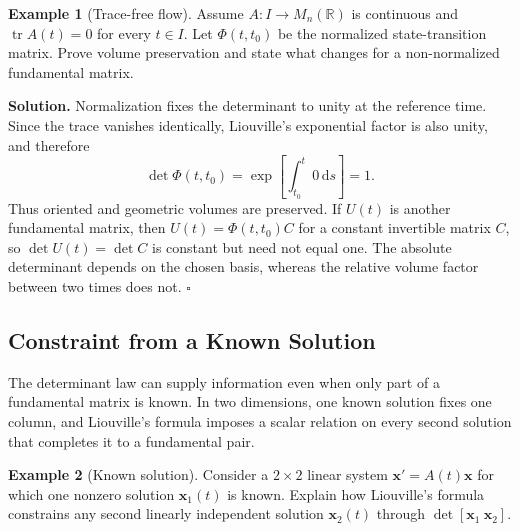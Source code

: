 \documentclass[11pt,a4paper]{article}
\newcommand{\be}{\begin{equation}}
\newcommand{\ee}{\end{equation}}
\newcommand{\lb}[1]{\label{#1}}
\newcommand{\dd}{\mathrm{d}}
\newcommand{\R}{\mathbb{R}}
\DeclareMathOperator{\tr}{tr}
\theoremstyle{definition}
\newtheorem{example}{Example}[section]
\newenvironment{solution}
{\par\noindent\textbf{Solution.}}
{\hfill$\square$\par}
\numberwithin{equation}{section}
\begin{document}
\begin{example}[Trace-free flow]
Assume $A:I\rightarrow M_n(\R)$ is continuous and $\tr A(t)=0$ for every $t\in I$. Let $\Phi(t,t_0)$ be the normalized state-transition matrix. Prove volume preservation and state what changes for a non-normalized fundamental matrix.
\end{example}

\begin{solution}
Normalization fixes the determinant to unity at the reference time. Since the trace vanishes identically, Liouville's exponential factor is also unity, and therefore
\be
\det\Phi(t,t_0)
=
\exp\left[
\int_{t_0}^{t}0\,\dd s
\right]
=1.
\lb{eq:trace-free-normalized}
\ee
Thus oriented and geometric volumes are preserved. If $U(t)$ is another fundamental matrix, then $U(t)=\Phi(t,t_0)C$ for a constant invertible matrix $C$, so $\det U(t)=\det C$ is constant but need not equal one. The absolute determinant depends on the chosen basis, whereas the relative volume factor between two times does not.
\end{solution}

\subsection{Constraint from a Known Solution}

The determinant law can supply information even when only part of a fundamental matrix is known. In two dimensions, one known solution fixes one column, and Liouville's formula imposes a scalar relation on every second solution that completes it to a fundamental pair.

\begin{example}[Known solution]
Consider a $2\times2$ linear system $\mathbf{x}'=A(t)\mathbf{x}$ for which one nonzero solution $\mathbf{x}_1(t)$ is known. Explain how Liouville's formula constrains any second linearly independent solution $\mathbf{x}_2(t)$ through $\det[\mathbf{x}_1\ \mathbf{x}_2]$.
\end{example}
\end{document}
